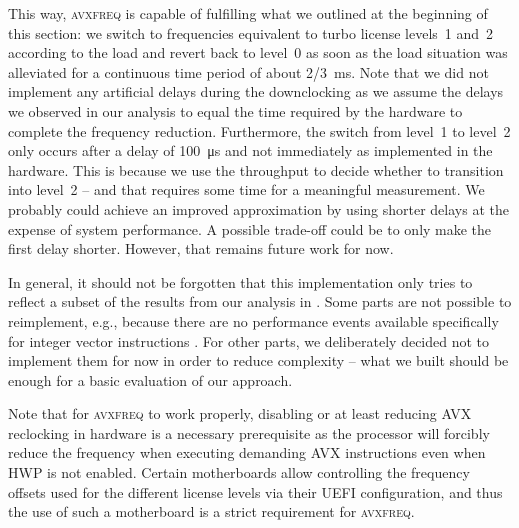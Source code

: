 This way, \textsc{avxfreq} is capable of fulfilling what we outlined at the beginning of this section: we switch to frequencies equivalent to turbo license levels~1 and~2 according to the load and revert back to level~0 as soon as the load situation was alleviated for a continuous time period of about \SI[quotient-mode=fraction]{2/3}{\milli\second}. Note that we did not implement any artificial delays during the downclocking as we assume the delays we observed in our analysis to equal the time required by the hardware to complete the frequency reduction. Furthermore, the switch from level~1 to level~2 only occurs after a delay of \SI{100}{\micro\second} and not immediately as implemented in the hardware. This is because we use the throughput to decide whether to transition into level~2 -- and that requires some time for a meaningful measurement. We probably could achieve an improved approximation by using shorter delays at the expense of system performance. A possible trade-off could be to only make the first delay shorter. However, that remains future work for now.

In general, it should not be forgotten that this implementation only tries to reflect a subset of the results from our analysis in . Some parts are not possible to reimplement, e.g., because there are no performance events available specifically for integer vector instructions \cite{intelsdmsysprogguide}. For other parts, we deliberately decided not to implement them for now in order to reduce complexity -- what we built should be enough for a basic evaluation of our approach.

Note that for \textsc{avxfreq} to work properly, disabling or at least reducing \gls{AVX} reclocking in hardware is a necessary prerequisite as the processor will forcibly reduce the frequency when executing demanding \gls{AVX} instructions even when \gls{HWP} is not enabled. Certain motherboards allow controlling the frequency offsets used for the different license levels via their \gls{UEFI} configuration, and thus the use of such a motherboard is a strict requirement for \textsc{avxfreq}.

